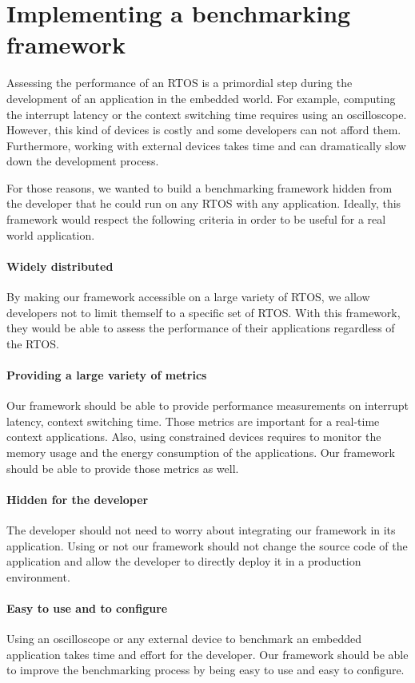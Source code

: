 \section{Implementing a benchmarking framework}

Assessing the performance of an RTOS is a primordial step during the development of an application in the embedded world.
For example, computing the interrupt latency or the context switching time requires using an oscilloscope.
However, this kind of devices is costly and some developers can not afford them.
Furthermore, working with external devices takes time and can dramatically slow down the development process.

For those reasons, we wanted to build a benchmarking framework hidden from the developer that he could run on any RTOS with any application.
Ideally, this framework would respect the following criteria in order to be useful for a real world application.

\paragraph{Widely distributed}
By making our framework accessible on a large variety of RTOS, we allow developers not to limit themself to a specific set of RTOS.
With this framework, they would be able to assess the performance of their applications regardless of the RTOS.

\paragraph{Providing a large variety of metrics}
Our framework should be able to provide performance measurements on interrupt latency, context switching time.
Those metrics are important for a real-time context applications.
Also, using constrained devices requires to monitor the memory usage and the energy consumption of the applications.
Our framework should be able to provide those metrics as well.

\paragraph{Hidden for the developer}
The developer should not need to worry about integrating our framework in its application.
Using or not our framework should not change the source code of the application and allow the developer to directly deploy it in a production environment.

\paragraph{Easy to use and to configure}
Using an oscilloscope or any external device to benchmark an embedded application takes time and effort for the developer.
Our framework should be able to improve the benchmarking process by being easy to use and easy to configure.

